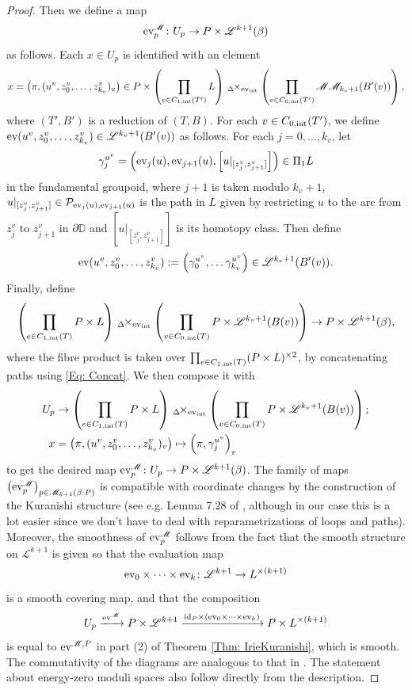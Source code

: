 \documentclass[10pt]{amsart}
\numberwithin{equation}{section}
\theoremstyle{plain}
\theoremstyle{definition}
\theoremstyle{remark}
\numberwithin{equation}{section}
\newcommand{\id}{\textup{id}}
\newcommand{\ev}{\textup{ev}}
\newcommand{\ms}[1]{\mathscr{#1}}
\newcommand{\fiberprod}[2]{\,_{#1}\!\!\times_{#2} }
\begin{document}
{\begin{proof}
	Then we define a map 
		\[\ev_p^\mathscr{M}\colon U_p\to P\times \mathscr{L}^{k+1}(\beta)\]
	as follows. Each $x\in U_p$ is identified with an element \[
		x=\left(\pi, (u^v,z_0^v,\dots, z_{k_v}^v)_{v}\right) \in P\times \left(\prod_{e\in C_{1,\textup{int}}(T')} L\right) \fiberprod{\Delta}{\ev_{\textup{int}}} \left( \prod_{v\in C_{0,\textup{int}}(T')} \ms{M}\ms{M}_{k_v+1}(B'(v))\right),
	\]
	where $(T',B')$ is a reduction of $(T,B)$.
	For each $v\in C_{0,\textup{int}}(T')$, we define $\ev(u^v, z_0^v,\dots, z_{k_v}^v)\in \mathscr{L}^{k_v+1}(B'(v))$ as follows. For each $j=0,\dots, k_v$, let \[\gamma_j^{u^v}=\left(\ev_j(u), \ev_{j+1}(u), \left[u|_{[z_j^v,z_{j+1}^v]}\right]\right)\in \Pi_1L\] in the fundamental groupoid, where $j+1$ is taken modulo $k_v+1$,  $u|_{[z_j^v,z_{j+1}^v]}\in \mathcal{P}_{\ev_j(u),\ev_{j+1}(u)}$ is the path in $L$ given by restricting $u$ to the arc from $z_j^v$ to $z_{j+1}^v$ in $\partial \mathbb{D}$ and $\left[u|_{[z_j^v,z_{j+1}^v]}\right]$ is its homotopy class.
	Then define \[\ev(u^v,z_0^v,\dots, z^v_{k_v}):= \left(\gamma_0^{u^v},\dots \gamma_{k_v}^{u^v}\right)\in \mathscr{L}^{k_v+1}(B'(v)).\]
	Finally, define \begin{align*}
		\left(\prod_{e\in C_{1,\textup{int}}(T)}P\times L\right)\fiberprod{\Delta}{\ev_{\textup{int}}} \left( \prod_{v\in C_{0,\textup{int}}(T)} P\times \mathscr{L}^{k_v+1}(B(v))\right) \to P\times \mathscr{L}^{k+1}(\beta),
	\end{align*}
	where the fibre product is taken over $\prod_{e\in C_{1,\textup{int}}(T)}(P\times L)^{\times 2}$,
	by concatenating paths using \eqref{Eq: Concat}. 
	We then compose  it with 
	\begin{align*}
				U_p&\to \left(\prod_{e\in C_{1,\textup{int}}(T)}P\times L\right)\fiberprod{\Delta}{\ev_{\textup{int}}} \left( \prod_{v\in C_{0,\textup{int}}(T)} P\times \mathscr{L}^{k_v+1}(B(v))\right);\\
				x&=\left(\pi, (u^v,z_0^v,\dots, z_{k_v}^v)_{v}\right) \mapsto \left(\pi,  \gamma_j^{u^v}\right)_v
	\end{align*}
	to get the desired map $\ev_p^\mathscr{M}\colon U_p\to P\times \mathscr{L}^{k+1}(\beta)$.
	The family of maps $\left( \ev_p^\mathscr{M}\right)_{p\in \mathscr{M}_{k+1}(\beta:P)}$ is compatible with coordinate changes by the construction of the Kuranishi structure (see e.g. Lemma 7.28 of \cite{Irie2}, although in our case this is a lot easier since we don't have to deal with reparametrizations of loops and paths).
	Moreover, the smoothness of $\ev_p^\mathscr{M}$ follows from the fact that the smooth structure on $\mathscr{L}^{k+1}$ is given  so that the evaluation map
	\[
		\ev_0\times \dots \times \ev_k\colon \mathscr{L}^{k+1}\to L^{\times (k+1)}
	\]
	is a smooth covering map, and that the composition \[
		U_p \xrightarrow{\ev^{\mathscr{M}}}  P \times \mathscr{L}^{k+1} \xrightarrow{\id_P\times (\ev_0\times \dots \times \ev_k)} P\times L^{\times (k+1)}
	\]
	is equal to $\ev^{\mathscr{M}, P}$ in part (2) of Theorem \ref{Thm: IrieKuranishi}, which is smooth.
	The commutativity of the diagrams are analogous to that in \cite{Irie2}.
	The statement about energy-zero moduli spaces also follow directly from the description.
\end{proof}

}
\end{document}

